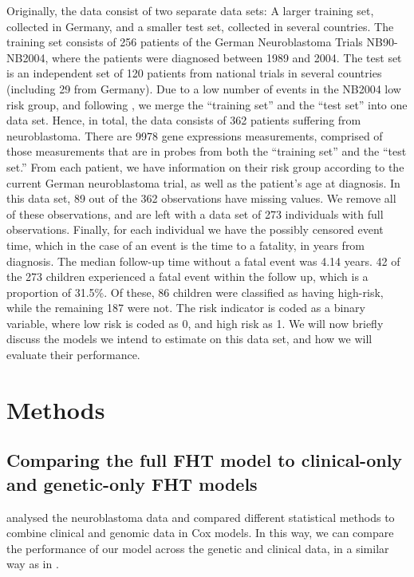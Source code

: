 Originally, the data consist of two separate data sets:
A larger training set, collected in Germany, and a smaller test set, collected in several countries.
The training set consists of 256 patients of the German Neuroblastoma Trials NB90-NB2004, where the patients were diagnosed between 1989 and 2004.
The test set is an independent set of 120 patients from national trials in several countries (including 29 from Germany).
Due to a low number of events in the NB2004 low risk group, and following \citet{bovelstad2009}, we merge the ``training set'' and the ``test set'' into one data set.
Hence, in total, the data consists of 362 patients suffering from neuroblastoma.
There are 9978 gene expressions measurements, comprised of those measurements that are in probes from both the ``training set'' and the ``test set.''
From each patient, we have information on their risk group according to the current German neuroblastoma trial, as well as the patient's age at diagnosis.
In this data set, 89 out of the 362 observations have missing values.
We remove all of these observations, and are left with a data set of 273 individuals with full observations.
Finally, for each individual we have the possibly censored event time, which in the case of an event is the time to a fatality, in years from diagnosis.
The median follow-up time without a fatal event was 4.14 years.
42 of the 273 children experienced a fatal event within the follow up, which is a proportion of 31.5\%.
Of these, 86 children were classified as having high-risk, while the remaining 187 were not.
The risk indicator is coded as a binary variable, where low risk is coded as 0, and high risk as 1.
We will now briefly discuss the models we intend to estimate on this data set, and how we will evaluate their performance.

\section{Methods}
\subsection{Comparing the full FHT model to clinical-only and genetic-only FHT models}
\citet{bovelstad2009} analysed the neuroblastoma data and compared different statistical methods to combine clinical and genomic data in Cox models.
In this way, we can compare the performance of our model across the genetic and clinical data, in a similar way as in \citet{bovelstad2009}.

